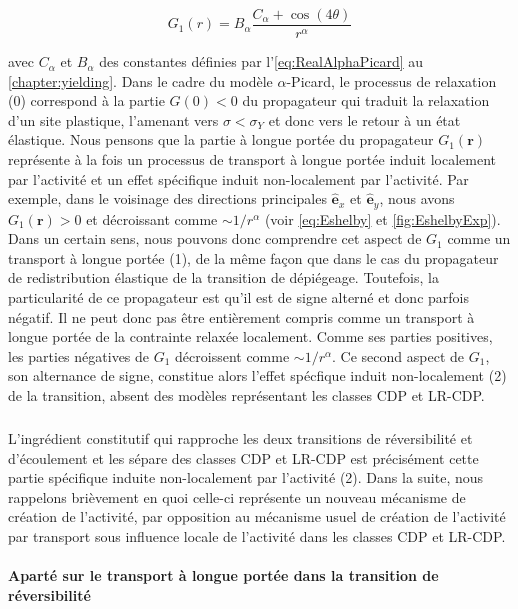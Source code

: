\begin{equation}
	G_1(r) = B_\alpha\frac{C_\alpha + \cos (4\theta)}{r^\alpha}
\end{equation}

\noindent avec $C_\alpha$ et $B_\alpha$ des constantes définies par l'\autoref{eq:RealAlphaPicard} au \autoref{chapter:yielding}. Dans le cadre du modèle $\alpha$-Picard, le processus de relaxation (0) correspond à la partie $G(0)<0$ du propagateur qui traduit la relaxation d'un site plastique, l'amenant vers $\sigma < \sigma_Y$ et donc vers le retour à un état élastique. Nous pensons que la partie à longue portée du propagateur $G_1(\mathbf{r})$ représente à la fois un processus de transport à longue portée induit localement par l'activité et un effet spécifique induit non-localement par l'activité. Par exemple, dans le voisinage des directions principales $\hat{\mathbf{e}}_x$ et $\hat{\mathbf{e}}_y$, nous avons $G_1(\mathbf{r})>0$ et décroissant comme $\sim 1/r^\alpha$ (voir \autoref{eq:Eshelby} et \autoref{fig:EshelbyExp}). Dans un certain sens, nous pouvons donc comprendre cet aspect de $G_1$ comme un transport à longue portée (1), de la même façon que dans le cas du propagateur de redistribution élastique de la transition de dépiégeage. Toutefois, la particularité de ce propagateur est qu'il est de signe alterné et donc parfois négatif. Il ne peut donc pas être entièrement compris comme un transport à longue portée de la contrainte relaxée localement. Comme ses parties positives, les parties négatives de $G_1$ décroissent comme $\sim 1/r^\alpha$. Ce second aspect de $G_1$, son alternance de signe, constitue alors l'effet spécfique induit non-localement (2) de la transition, absent des modèles représentant les classes CDP et LR-CDP.

\subparagraph{}L'ingrédient constitutif qui rapproche les deux transitions de réversibilité et d'écoulement et les sépare des classes CDP et LR-CDP est précisément cette partie spécifique induite non-localement par l'activité (2). Dans la suite, nous rappelons brièvement en quoi celle-ci représente un nouveau mécanisme de création de l'activité, par opposition au mécanisme usuel de création de l'activité par transport sous influence locale de l'activité dans les classes CDP et LR-CDP.

\paragraph{Aparté sur le transport à longue portée dans la transition de réversibilité}

